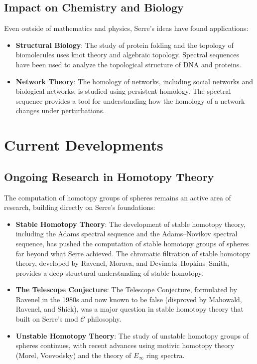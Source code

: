 \subsection{Impact on Chemistry and Biology}

Even outside of mathematics and physics, Serre's ideas have found applications:

\begin{itemize}
\item \textbf{Structural Biology}: The study of protein folding and the topology of biomolecules uses knot theory and algebraic topology. Spectral sequences have been used to analyze the topological structure of DNA and proteins.

\item \textbf{Network Theory}: The homology of networks, including social networks and biological networks, is studied using persistent homology. The spectral sequence provides a tool for understanding how the homology of a network changes under perturbations.
\end{itemize}

\section{Current Developments}

\subsection{Ongoing Research in Homotopy Theory}

The computation of homotopy groups of spheres remains an active area of research, building directly on Serre's foundations:

\begin{itemize}
\item \textbf{Stable Homotopy Theory}: The development of stable homotopy theory, including the Adams spectral sequence and the Adams--Novikov spectral sequence, has pushed the computation of stable homotopy groups of spheres far beyond what Serre achieved. The chromatic filtration of stable homotopy theory, developed by Ravenel, Morava, and Devinatz--Hopkins--Smith, provides a deep structural understanding of stable homotopy.

\item \textbf{The Telescope Conjecture}: The Telescope Conjecture, formulated by Ravenel in the 1980s and now known to be false (disproved by Mahowald, Ravenel, and Shick), was a major question in stable homotopy theory that built on Serre's mod $\mathcal{C}$ philosophy.

\item \textbf{Unstable Homotopy Theory}: The study of unstable homotopy groups of spheres continues, with recent advances using motivic homotopy theory (Morel, Voevodsky) and the theory of $E_\infty$ ring spectra.
\end{itemize}

